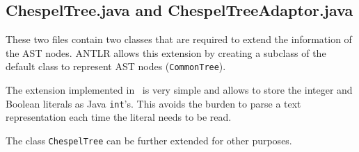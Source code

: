 \subsection{ChespelTree.java and ChespelTreeAdaptor.java}

These two files contain two classes that are required to extend the
information of the AST nodes. ANTLR allows this extension by creating
a subclass of the default class to represent AST nodes (\texttt{CommonTree}).

The extension implemented in \Chespel\ is very simple and allows to store the
integer and Boolean literals as Java \texttt{int}'s. This avoids the burden
to parse a text representation each time the literal needs to be read.

The class \texttt{ChespelTree} can be further extended for other purposes.
